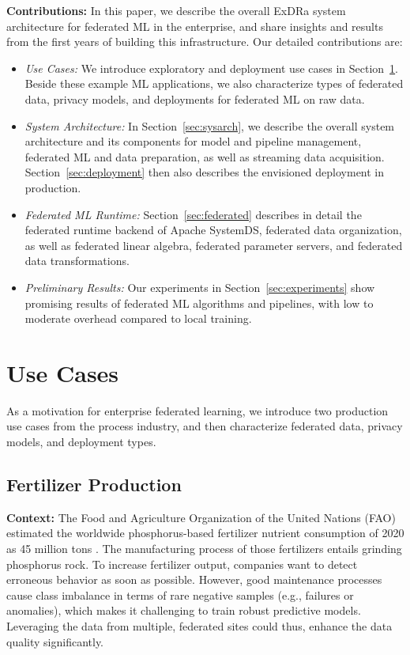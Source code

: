 \documentclass[sigconf,screen]{acmart}
\newenvironment{itemize2}{\begin{itemize}\setlength{\itemsep}{2.5pt}\setlength{\parskip}{0pt}\setlength{\parsep}{0pt}}{\end{itemize}}
\begin{document}
\textbf{Contributions:} In this paper, we describe the overall ExDRa system architecture for federated ML in the enterprise, and share insights and results from the first years of building this infrastructure. Our detailed contributions are:
\begin{itemize2}
\item \emph{Use Cases:} We introduce exploratory and deployment use cases in Section~\ref{sec:usecases}. Beside these example ML applications, we also characterize types of federated data, privacy models, and deployments for federated ML on raw data.
\item \emph{System Architecture:} In Section~\ref{sec:sysarch}, we describe the overall system architecture and its components for model and pipeline management, federated ML and data preparation, as well as streaming data acquisition. Section~\ref{sec:deployment} then also describes the envisioned deployment in production.
\item \emph{Federated ML Runtime:} Section~\ref{sec:federated} describes in detail the federated runtime backend of Apache SystemDS, federated data organization, as well as federated linear algebra, federated parameter servers, and federated data transformations.
\item \emph{Preliminary Results:} Our experiments in Section~\ref{sec:experiments} show promising results of federated ML algorithms and pipelines, with low to moderate overhead compared to local training.
\end{itemize2}

\section{Use Cases} 
\label{sec:usecases}

As a motivation for enterprise federated learning, we introduce two production use cases from the process industry, and then characterize federated data, privacy models, and deployment types. 

\subsection{Fertilizer Production}
\label{sec:fertilizer}

\textbf{Context:} The Food and Agriculture Organization of the United Nations (FAO) estimated the worldwide phosphorus-based fertilizer nutrient consumption of 2020 as 45 million tons \cite{fertilizer}. The manufacturing process of those fertilizers entails grinding phosphorus rock. To increase fertilizer output, companies want to detect erroneous behavior as soon as possible. However, good maintenance processes cause class imbalance in terms of rare negative samples (e.g., failures or anomalies), which makes it challenging to train robust predictive models. Leveraging the data from multiple, federated sites could thus, enhance the data quality significantly.
\end{document}
